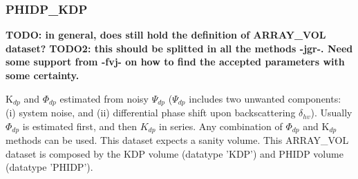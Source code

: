 \documentclass[a4paper,11pt,pdftex,twoside]{scrartcl}
\renewcommand{\bf}{\normalfont \bfseries}
\begin{document}
{{{%
%
%

\subsubsection{PHIDP\_KDP}
\label{subsec_phidp_kdp}

{\bf TODO: in general, does still hold the definition of ARRAY\_VOL dataset?}
{\bf TODO2: this should be splitted in all the methods -jgr-. Need some support from -fvj- on how to find the accepted parameters with some certainty. }

K$_{dp}$ and $\Phi_{dp}$ estimated from noisy  $\Psi_{dp}$ ($\Psi_{dp}$ includes two unwanted components: (i) system noise, and (ii) differential phase shift upon backscattering $\delta_{hv}$). Usually $\Phi_{dp}$ is estimated first, and then $K_{dp}$ in series. Any combination of $\Phi_{dp}$ and K$_{dp}$ methods can be used. This dataset expects a sanity volume. This ARRAY\_VOL dataset is composed by the KDP volume (datatype 'KDP') and PHIDP volume (datatype 'PHIDP').

}}}
\end{document}
